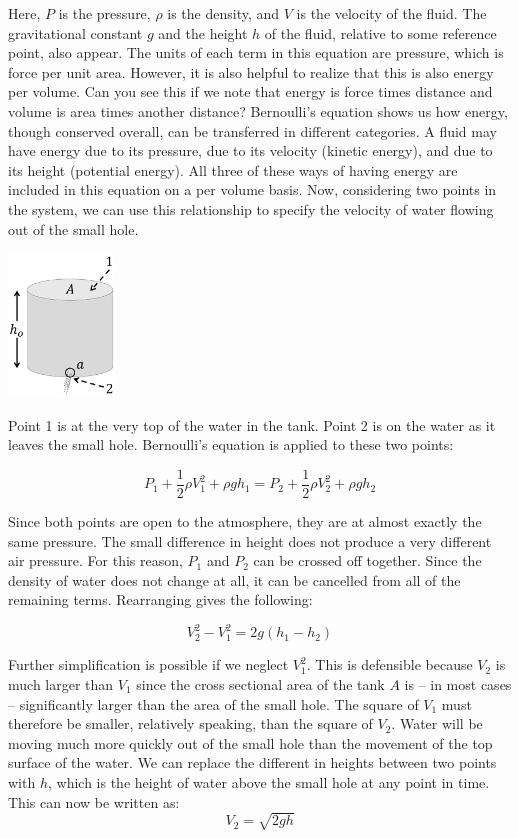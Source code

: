 \documentclass{ximera}
\begin{document}
Here, $P$ is the pressure, $\rho$  is the density, and $V$ is the velocity of the fluid.  The gravitational constant $g$ and the height $h$ of the fluid, relative to some reference point, also appear.
The units of each term in this equation are pressure, which is force per unit area.  However, it is also helpful to realize that this is also energy per volume.  Can you see this if we note that energy is force times distance and volume is area times another distance?  Bernoulli’s equation shows us how energy, though conserved overall, can be transferred in different categories.  A fluid may have energy due to its pressure, due to its velocity (kinetic energy), and due to its height (potential energy).  All three of these ways of having energy are included in this equation on a per volume basis.  Now, considering two points in the system, we can use this relationship to specify the velocity of water flowing out of the small hole. 
\begin{image}
 \includegraphics[height=1.5in]{drainingTank2.jpg}
\end{image}
 
Point 1 is at the very top of the water in the tank.  Point 2 is on the water as it leaves the small hole.  Bernoulli’s equation is applied to these two points:
 
$$P_1+\frac{1}{2}\rho V_1^2+\rho gh_1=P_2+\frac{1}{2}\rho V_2^2+\rho gh_2$$
 
Since both points are open to the atmosphere, they are at almost exactly the same pressure.  The small difference in height does not produce a very different air pressure.  For this reason, $P_1$ and $P_2$ can be crossed off together.  Since the density  of water does not change at all, it can be cancelled from all of the remaining terms.  Rearranging gives the following:
 
$$V_2^2-V_1^2=2g(h_1-h_2)$$
 
Further simplification is possible if we neglect $V_1^2$.  This is defensible because $V_2$ is much larger than $V_1$ since the cross sectional area of the tank $A$ is – in most cases – significantly larger than the area of the small hole.  The square of $V_1$  must therefore be smaller, relatively speaking, than the square of $V_2$. Water will be moving much more quickly out of the small hole than the movement of the top surface of the water.  We can replace the different in heights between two points with $h$, which is the height of water above the small hole at any point in time.  This can now be written as:
 $$V_2=\sqrt{2gh}$$
  
\end{document}
